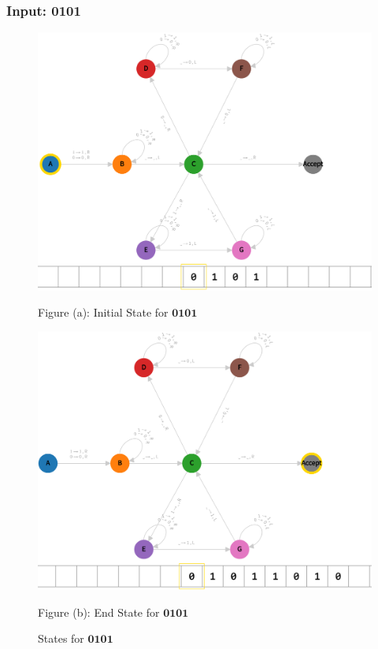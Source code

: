 \vspace*{\fill}

\newpage

\vspace*{\fill}

\subsubsection*{Input: 0101}
\label{q2-0101}

\begin{figure}[ht]
  \centering
  \begin{minipage}{.49\linewidth}
    \centering
    \includegraphics[width=\linewidth]{answers/img/q2-0101-initial.png}
    \caption*{Figure (a): Initial State for $\mathbf{0101}$}
    \label{fig:0101-initial}
  \end{minipage}
  \begin{minipage}{.49\linewidth}
    \centering
    \includegraphics[width=\linewidth]{answers/img/q2-0101-end.png}
    \caption*{Figure (b): End State for $\mathbf{0101}$}
    \label{fig:0101-end}
  \end{minipage}
  \caption{States for $\mathbf{0101}$}
  \label{fig:in-0101}
\end{figure}

